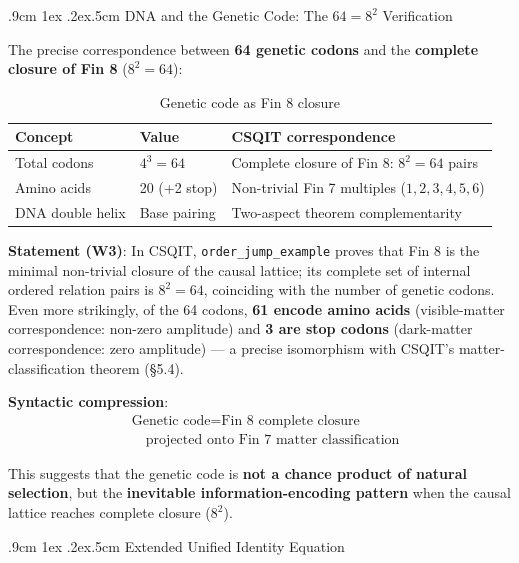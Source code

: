 \documentclass[aps,prd,twocolumn,nofootinbib,floatfix]{revtex4-2}
\makeatletter
\def\subsection{%
  \@startsection{subsection}{2}{\z@}
    {.9cm \@plus1ex \@minus .2ex}{.5cm}
    {\normalfont\normalsize\bfseries\centering}%
}
\makeatother
\begin{document}
\subsection{DNA and the Genetic Code: The $64 = 8^2$ Verification}

The precise correspondence between \textbf{64 genetic codons} and the \textbf{complete closure of Fin 8} ($8^2 = 64$):

\begin{table}[!t]
\centering
\begin{tabular}{|l|l|l|}
\hline
Concept & Value & CSQIT correspondence \\
\hline
Total codons & $4^3 = 64$ & Complete closure of Fin 8: $8^2 = 64$ pairs \\
Amino acids & 20 (+2 stop) & Non-trivial Fin 7 multiples ($1,2,3,4,5,6$) \\
DNA double helix & Base pairing & Two-aspect theorem complementarity \\
\hline
\end{tabular}
\caption{Genetic code as Fin 8 closure}
\end{table}

\textbf{Statement (W3)}: In CSQIT, \texttt{order\_jump\_example} proves that Fin 8 is the minimal non-trivial closure of the causal lattice; its complete set of internal ordered relation pairs is $8^2 = 64$, coinciding with the number of genetic codons. Even more strikingly, of the 64 codons, \textbf{61 encode amino acids} (visible-matter correspondence: non-zero amplitude) and \textbf{3 are stop codons} (dark-matter correspondence: zero amplitude) --- a precise isomorphism with CSQIT's matter-classification theorem (\S 5.4).

\textbf{Syntactic compression}:
\[
\boxed{\begin{aligned}
&\text{Genetic code} = \text{Fin 8 complete closure} \\
&\quad\text{projected onto Fin 7 matter classification}
\end{aligned}}
\]

This suggests that the genetic code is \textbf{not a chance product of natural selection}, but the \textbf{inevitable information-encoding pattern} when the causal lattice reaches complete closure ($8^2$).

\subsection{Extended Unified Identity Equation}
\end{document}
